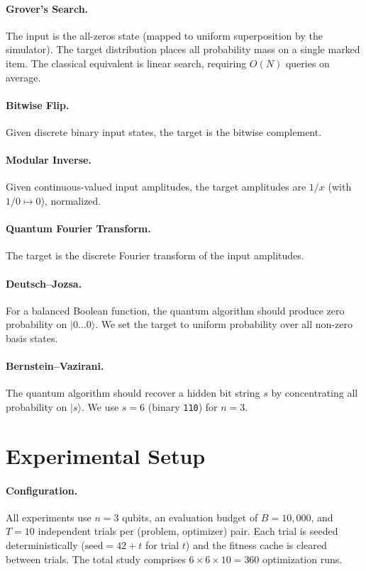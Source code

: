 \documentclass[twocolumn,11pt]{article}
\begin{document}
\paragraph{Grover's Search.}
The input is the all-zeros state (mapped to uniform superposition by the
simulator).  The target distribution places all probability mass on a single
marked item.  The classical equivalent is linear search, requiring $O(N)$
queries on average.

\paragraph{Bitwise Flip.}
Given discrete binary input states, the target is the bitwise complement.

\paragraph{Modular Inverse.}
Given continuous-valued input amplitudes, the target amplitudes are $1/x$
(with $1/0 \mapsto 0$), normalized.

\paragraph{Quantum Fourier Transform.}
The target is the discrete Fourier transform of the input amplitudes.

\paragraph{Deutsch--Jozsa.}
For a balanced Boolean function, the quantum algorithm should produce zero
probability on $|0\ldots 0\rangle$.  We set the target to uniform probability
over all non-zero basis states.

\paragraph{Bernstein--Vazirani.}
The quantum algorithm should recover a hidden bit string $s$ by concentrating
all probability on $|s\rangle$.  We use $s = 6$ (binary \texttt{110}) for
$n{=}3$.

\section{Experimental Setup}\label{sec:setup}

\paragraph{Configuration.}
All experiments use $n{=}3$ qubits, an evaluation budget of $B{=}10{,}000$, and
$T{=}10$ independent trials per (problem, optimizer) pair.  Each trial is seeded
deterministically ($\text{seed} = 42 + t$ for trial $t$) and the fitness cache
is cleared between trials.  The total study comprises $6 \times 6 \times 10 =
360$ optimization runs.
\end{document}
